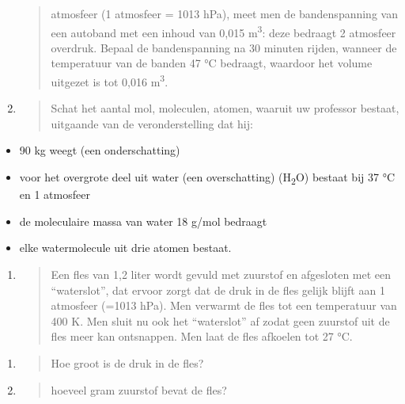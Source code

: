 \documentclass[]{article}
\begin{document}
\begin{enumerate}
\begin{quote}
  atmosfeer (1 atmosfeer = 1013 hPa), meet men de bandenspanning van een
  autoband met een inhoud van 0,015 m\textsuperscript{3}: deze bedraagt
  2 atmosfeer overdruk. Bepaal de bandenspanning na 30 minuten rijden,
  wanneer de temperatuur van de banden 47 °C bedraagt, waardoor het
  volume uitgezet is tot 0,016 m\textsuperscript{3}.
  \end{quote}
\item
  \begin{quote}
  Schat het aantal mol, moleculen, atomen, waaruit uw professor bestaat,
  uitgaande van de veronderstelling dat hij:
  \end{quote}
\end{enumerate}

\begin{itemize}
\item
  90 kg weegt (een onderschatting)
\item
  voor het overgrote deel uit water (een overschatting)
  (H\textsubscript{2}O) bestaat bij 37 °C en 1 atmosfeer
\item
  de moleculaire massa van water 18 g/mol bedraagt
\item
  elke watermolecule uit drie atomen bestaat.
\end{itemize}

\begin{enumerate}
\def\labelenumi{\arabic{enumi}.}
\setcounter{enumi}{6}
\item
  \begin{quote}
  Een fles van 1,2 liter wordt gevuld met zuurstof en afgesloten met een
  ``waterslot'', dat ervoor zorgt dat de druk in de fles gelijk blijft
  aan 1 atmosfeer (=1013 hPa). Men verwarmt de fles tot een temperatuur
  van 400 K. Men sluit nu ook het ``waterslot'' af zodat geen zuurstof
  uit de fles meer kan ontsnappen. Men laat de fles afkoelen tot 27 °C.
  \end{quote}
\end{enumerate}

\begin{enumerate}
\def\labelenumi{\alph{enumi}.}
\item
  \begin{quote}
  Hoe groot is de druk in de fles?
  \end{quote}
\item
  \begin{quote}
  hoeveel gram zuurstof bevat de fles?
  \end{quote}
\end{enumerate}
\end{document}
